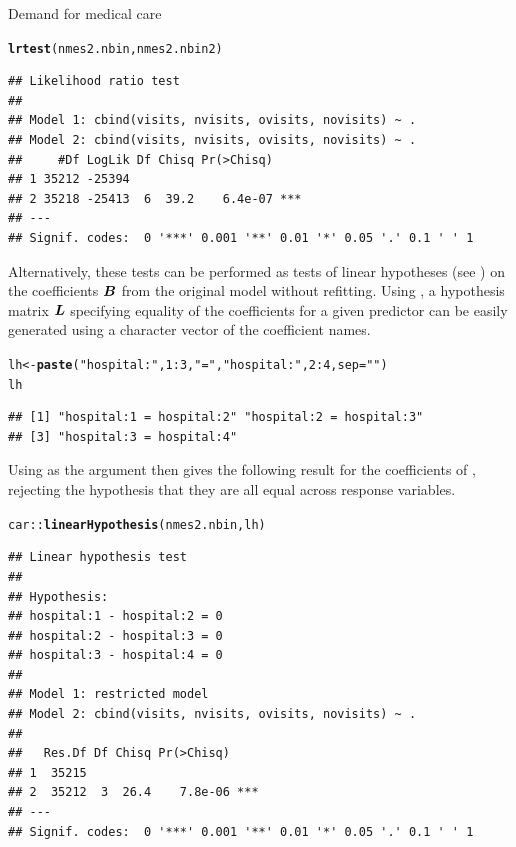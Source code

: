 \documentclass[11pt]{book}\usepackage[]{graphicx}\usepackage[]{color}
\makeatletter
\newcommand{\hlnum}[1]{\textcolor[rgb]{0.686,0.059,0.569}{#1}}%
\newcommand{\hlstr}[1]{\textcolor[rgb]{0.192,0.494,0.8}{#1}}%
\newcommand{\hlopt}[1]{\textcolor[rgb]{0,0,0}{#1}}%
\newcommand{\hlstd}[1]{\textcolor[rgb]{0.345,0.345,0.345}{#1}}%
\newcommand{\hlkwb}[1]{\textcolor[rgb]{0.69,0.353,0.396}{#1}}%
\newcommand{\hlkwc}[1]{\textcolor[rgb]{0.333,0.667,0.333}{#1}}%
\newcommand{\hlkwd}[1]{\textcolor[rgb]{0.737,0.353,0.396}{\textbf{#1}}}%
\newenvironment{kframe}{%
 \def\at@end@of@kframe{}%
 \ifinner\ifhmode%
  \def\at@end@of@kframe{\end{minipage}}%
  \begin{minipage}{\columnwidth}%
 \fi\fi%
 \def\FrameCommand##1{\hskip\@totalleftmargin \hskip-\fboxsep
 \colorbox{shadecolor}{##1}\hskip-\fboxsep
     \hskip-\linewidth \hskip-\@totalleftmargin \hskip\columnwidth}%
 \MakeFramed {\advance\hsize-\width
   \@totalleftmargin\z@ \linewidth\hsize
   \@setminipage}}%
 {\par\unskip\endMakeFramed%
 \at@end@of@kframe}
\newenvironment{knitrout}{}{} %
\renewenvironment{knitrout}{\small\renewcommand{\baselinestretch}{.85}}{} %
\makeatother
\begin{document}
\begin{Example}[nmes5]{Demand for medical care}
\begin{knitrout}
\begin{kframe}
\begin{alltt}
\hlkwd{lrtest}\hlstd{(nmes2.nbin, nmes2.nbin2)}
\end{alltt}
\begin{verbatim}
## Likelihood ratio test
## 
## Model 1: cbind(visits, nvisits, ovisits, novisits) ~ .
## Model 2: cbind(visits, nvisits, ovisits, novisits) ~ .
##     #Df LogLik Df Chisq Pr(>Chisq)    
## 1 35212 -25394                        
## 2 35218 -25413  6  39.2    6.4e-07 ***
## ---
## Signif. codes:  0 '***' 0.001 '**' 0.01 '*' 0.05 '.' 0.1 ' ' 1
\end{verbatim}
\end{kframe}
\end{knitrout}

Alternatively, these tests can be performed as tests of linear hypotheses (see )
on the coefficients
$\bm{B}$ from the original model without refitting. Using , a hypothesis
matrix $\bm{L}$ specifying equality of the coefficients for a given predictor can be
easily generated using a character vector of the coefficient names.

\begin{knitrout}
\color{fgcolor}\begin{kframe}
\begin{alltt}
\hlstd{lh} \hlkwb{<-} \hlkwd{paste}\hlstd{(}\hlstr{"hospital:"}\hlstd{,} \hlnum{1}\hlopt{:}\hlnum{3}\hlstd{,} \hlstr{" = "}\hlstd{,} \hlstr{"hospital:"}\hlstd{,} \hlnum{2}\hlopt{:}\hlnum{4}\hlstd{,} \hlkwc{sep}\hlstd{=}\hlstr{""}\hlstd{)}
\hlstd{lh}
\end{alltt}
\begin{verbatim}
## [1] "hospital:1 = hospital:2" "hospital:2 = hospital:3"
## [3] "hospital:3 = hospital:4"
\end{verbatim}
\end{kframe}
\end{knitrout}
Using  as the  argument then gives the following result
for the coefficients of , rejecting the hypothesis that they are all equal
across response variables.
\begin{knitrout}
\color{fgcolor}\begin{kframe}
\begin{alltt}
\hlstd{car}\hlopt{::}\hlkwd{linearHypothesis}\hlstd{(nmes2.nbin, lh)}
\end{alltt}
\begin{verbatim}
## Linear hypothesis test
## 
## Hypothesis:
## hospital:1 - hospital:2 = 0
## hospital:2 - hospital:3 = 0
## hospital:3 - hospital:4 = 0
## 
## Model 1: restricted model
## Model 2: cbind(visits, nvisits, ovisits, novisits) ~ .
## 
##   Res.Df Df Chisq Pr(>Chisq)    
## 1  35215                        
## 2  35212  3  26.4    7.8e-06 ***
## ---
## Signif. codes:  0 '***' 0.001 '**' 0.01 '*' 0.05 '.' 0.1 ' ' 1
\end{verbatim}
\end{kframe}
\end{knitrout}
\end{Example}
\end{document}
